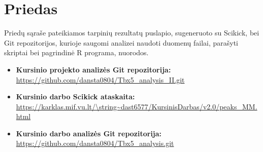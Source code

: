 \documentclass[12pt]{article}
\begin{document}

\section{Priedas} \label{Priedas}

Priedų sąraše pateikiamos tarpinių rezultatų puslapio, sugeneruoto su Scikick,
bei Git repozitorijos, kurioje saugomi analizei naudoti duomenų failai,
parašyti skriptai bei pagrindinė R programa, nuorodos.

\begin{itemize}
    \item \textbf{Kursinio projekto analizės Git repozitorija:}\\
        \url{https://github.com/dansta0804/Tbx5\_analysis\_II.git}
    \item \textbf{Kursinio darbo Scikick ataskaita:}\\
        \url{https://karklas.mif.vu.lt/\string~dast6577/KursinisDarbas/v2.0/peaks\_MM.html}
    \item \textbf{Kursinio darbo analizės Git repozitorija:}\\
        \url{https://github.com/dansta0804/Tbx5\_analysis.git}
\end{itemize}
\end{document}
